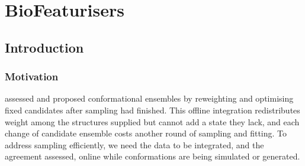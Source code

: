 \chapter{BioFeaturisers}
\label{ch:biofeaturisers}





\section{Introduction}
\label{sec:biofeat-intro}

\subsection{Motivation}
\label{sec:biofeat-motivation}

 assessed and proposed conformational ensembles by reweighting and optimising fixed candidates after sampling had finished. This offline integration redistributes weight among the structures supplied but cannot add a state they lack, and each change of candidate ensemble costs another round of sampling and fitting. To address sampling efficiently, we need the data to be integrated, and the agreement assessed, online while conformations are being simulated or generated.

